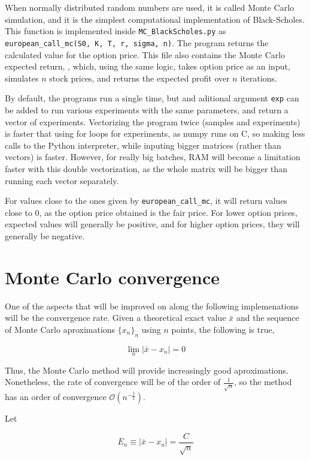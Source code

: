 \documentclass[11pt,oneside,parskip=half]{scrbook}  %
\begin{document}
When normally distributed random numbers are used, it is called Monte Carlo simulation, and it is the simplest computational implementation of Black-Scholes. This function is implemented inside \texttt{MC\_BlackScholes.py} as \texttt{european\_call\_mc(S0, K, T, r, sigma, n)}. The program returns the calculated value for the option price. This file also contains the Monte Carlo expected return, , which, using the same logic, takes option price as an input, simulates $n$ stock prices, and returns the expected profit over $n$ iterations.

By default, the programs run a single time, but and aditional argument \texttt{exp} can be added to run various experiments with the same parameters, and return a vector of experiments. Vectorizing the program twice (samples and experiments) is faster that using for loops for experiments, as numpy runs on C, so making less calls to the Python interpreter, while inputing bigger matrices (rather than vectors) is faster. However, for really big batches, RAM will become a limitation faster with this double vectorization, as the whole matrix will be bigger than running each vector separately.

For values close to the ones given by \texttt{european\_call\_mc}, it will return values close to 0, as the option price obtained is the fair price. For lower option prices, expected values will generally be positive, and for higher option prices, they will generally be negative.

\section{Monte Carlo convergence}

One of the aspects that will be improved on along the following implemenations will be the convergence rate. Given a theoretical exact value $\bar x$ and the sequence of Monte Carlo aproximations $\{ x_n\}_n$ using $n$ points, the following is true,

$$
\lim_n |\bar x-x_n|=0
$$

Thus, the Monte Carlo method will provide increasingly good aproximations. Nonetheless, the rate of convergence will be of the order of $\frac{1}{\sqrt{n}}$, so the method has an order of convergence $\mathcal{O}(n^{-\frac12})$.

\newpage
Let

$$
E_n\equiv |\bar{x}-x_n|=\frac{C}{\sqrt{n}}
$$
\end{document}
